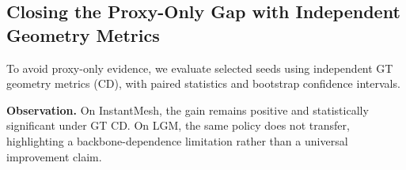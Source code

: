 \subsection{Closing the Proxy-Only Gap with Independent Geometry Metrics}
\label{sec:proxy-gap-closure}

To avoid proxy-only evidence, we evaluate selected seeds using independent GT geometry metrics (CD), with paired statistics and bootstrap confidence intervals.



\noindent\textbf{Observation.}
On InstantMesh, the gain remains positive and statistically significant under GT CD. On LGM, the same policy does not transfer, highlighting a backbone-dependence limitation rather than a universal improvement claim.
